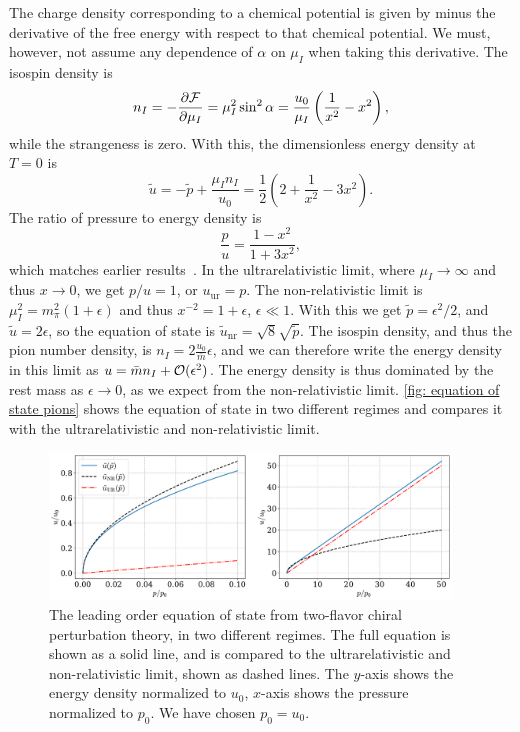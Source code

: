 %
The charge density corresponding to a chemical potential is given by minus the derivative of the free energy with respect to that chemical potential. 
We must, however, not assume any dependence of $\alpha$ on $\mu_I$ when taking this derivative.
The isospin density is
%
\begin{equation}
    n_I = -\pdv{\mathcal{F}}{\mu_I} = \mu_I^2 \sin^2 \alpha 
    = 
    \frac{u_0}{\mu_I} \left(\frac{1}{x^2} - x^2\right),
\end{equation}
%
while the strangeness is zero.
With this, the dimensionless energy density at $T = 0$ is
%
\begin{equation}
    \label{energy density leading order chpt}
    \tilde u = - \tilde p + \frac{\mu_I n_I}{u_0}
    = \frac{1}{2} \left( 2 + \frac{1}{x^2} - 3 x^2\right).
\end{equation}
% 
The ratio of pressure to energy density is
%
\begin{equation} 
    \label{pressure energy ratio leading order chpt}
    \frac{p}{u} = \frac{1- x^2}{1+3x^2},
\end{equation}
%
which matches earlier results~\autocite{sonQCDFiniteIsospin2001}.
In the ultrarelativistic limit, where $\mu_I \rightarrow \infty$ and thus $x \rightarrow 0$, we get $p / u = 1$, or $u_\text{ur} = p$.
The non-relativistic limit is $\mu_I^2 = m_\pi^2(1 + \epsilon)$ and thus $x^{-2} = 1 + \epsilon$, $\epsilon \ll 1$.
With this we get $\tilde p = \epsilon^2 / 2 $, and $\tilde u = 2\epsilon$, so the equation of state is $\tilde u_\text{nr} = \sqrt 8 \sqrt{\tilde p}$.
The isospin density, and thus the pion number density, is $n_I = 2 \frac{u_0}{\bar m} \epsilon$, and we can therefore write the energy density in this limit as $u = \bar m n_I + \mathcal O(\epsilon^2)$.
The energy density is thus dominated by the rest mass as $\epsilon \rightarrow 0$, as we expect from the non-relativistic limit.
\autoref{fig: equation of state pions} shows the equation of state in two different regimes and compares it with the ultrarelativistic and non-relativistic limit.

\begin{figure}[h]
    \centering
    \includegraphics[width=0.95\textwidth]{../scripts/figurer/pion_star/pion_eos.pdf}
    \caption{
        The leading order equation of state from two-flavor chiral perturbation theory, in two different regimes.
        The full equation is shown as a solid line, and is compared to the ultrarelativistic and non-relativistic limit, shown as dashed lines. 
        The $y$-axis shows the energy density normalized to $u_0$, $x$-axis shows the pressure normalized to $p_0$.
        We have chosen $p_0 = u_0$.
    }
    \label{fig: equation of state pions}
\end{figure}




